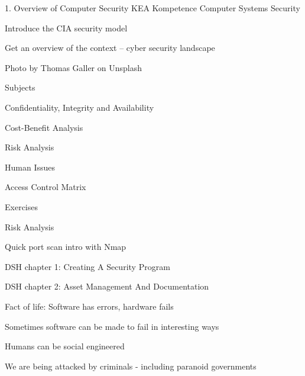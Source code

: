\documentclass[Screen16to9,17pt]{foils}
\begin{document}
\mytitlepage
{1. Overview of Computer Security}
{KEA Kompetence Computer Systems Security \the\year}




\begin{list2}
\item Introduce the CIA security model
\item Get an overview of the context -- cyber security landscape
\end{list2}

{\small\hfill  Photo by Thomas Galler on Unsplash}


\begin{list1}
\item Subjects
\begin{list2}
\item Confidentiality, Integrity and Availability
\item Cost-Benefit Analysis
\item Risk Analysis
\item Human Issues
\item Access Control Matrix
\end{list2}
\item Exercises
\begin{list2}
\item Risk Analysis
\item Quick port scan intro with Nmap
\end{list2}
\end{list1}





\begin{list1}
\item DSH chapter 1: Creating A Security Program
\item DSH chapter 2: Asset Management And Documentation
\end{list1}



\begin{list1}
\item Fact of life: Software has errors, hardware fails
\item Sometimes software can be made to fail in interesting ways
\item Humans can be social engineered
\item We are being attacked by criminals - including paranoid governments
\end{list1}
\end{document}
